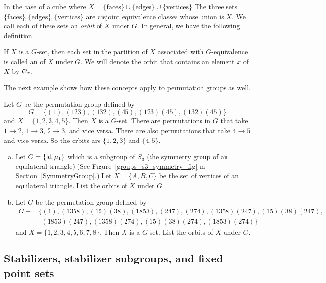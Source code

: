 In the case of a cube where $X=\{\text{faces}\}\cup\{\text{edges}\}\cup\{\text{vertices}\}$ The three sets $\{\text{faces}\},\{\text{edges}\},\{\text{vertices}\}$ are disjoint equivalence classes whose union is $X$. We call each of these sets an \emph{orbit} of $X$ under $G$.  In general, we have the following definition.

\begin{defn} \label{noteorbit}
If $X$ is a $G$-set, then each set in the partition of $X$ associated with
$G$-equivalence is called an  of $X$ under $G$. We will denote the orbit that contains an element $x$ of $X$ by
${\cal O}_x$. 
\end{defn}
The next example shows how these concepts apply to permutation groups as well.

\begin{example}\label{example:actions:Orbit1}
Let $G$ be the permutation group defined by
\[
G =\{(1), (1 23), (1 3 2), (4 5), (1 2 3)(4 5), (1 3 2)(4 5) \}
\]
and $X = \{ 1, 2, 3, 4, 5\}$. Then $X$ is a $G$-set. There are permutations in $G$ that take $1\rightarrow2$, $1\rightarrow3$, $2\rightarrow3$, and vice versa. There are also permutations that take $4\rightarrow 5$ and vice versa.  So the orbits are $\{1, 2, 3\}$ and $\{4, 5\}$. 
\end{example} 
 
\begin{exercise}\label{exercise:actions:orbits2}
\begin{enumerate}[(a)]
\item Let $G=\{\sf{id},\mu_1\}$ which is a subgroup of $S_3$ (the symmetry group of an equilateral triangle) (See Figure~\ref{groups_s3_symmetry_fig} in Section~\ref{SymmetryGroup}.) Let $X=\{A,B,C\}$ be the set of vertices of an equilateral triangle. List the orbits of $X$ under $G$
\item Let $G$ be the permutation group defined by
\begin{align*}
G =&\{(1), (1358),(15)(38), (1853), (247),(274), (1358)(247),(15)(38)(247),\\
&~~ (1853)(247),(1358)(274),(15)(38)(274),(1853)(274) \}
\end{align*}
and $X = \{ 1, 2, 3, 4, 5,6,7,8\}$. Then $X$ is a $G$-set.  List the orbits of $X$ under $G$.
\end{enumerate}
\end{exercise}


\subsection{Stabilizers, stabilizer subgroups, and fixed point sets}

